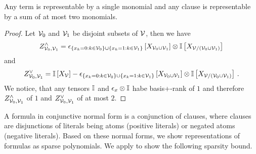\begin{lemma}
    \label{lem:clauseTermBasisPlus}
    Any term is representable by a single monomial and any clause is representable by a sum of at most two monomials. %
\end{lemma}
\begin{proof}
    Let $\mathcal{V}_0$ and $\mathcal{V}_1$ be disjoint subsets of $\mathcal{V}$, then we have
    \begin{align*}
        Z^{\land}_{\mathcal{V}_0,\mathcal{V}_1} = \epsilon_{
            \{x_{k} = 0 : k\in\mathcal{V}_0\} \cup \{x_{k} = 1 : k\in\mathcal{V}_1\}
        }\left[X_{\mathcal{V}_0\cup\mathcal{V}_1}\right] \otimes \mathbb{I}\left[X_{\mathcal{V}/(\mathcal{V}_0\cup\mathcal{V}_1)}\right]
    \end{align*}
    and
    \begin{align*}
        Z^{\lor}_{\mathcal{V}_0,\mathcal{V}_1} = \mathbb{I}\left[X_{\mathcal{V}}\right] - \epsilon_{
            \{x_{k} = 0 : k\in\mathcal{V}_0\} \cup \{x_{k} = 1 : k\in\mathcal{V}_1\}
        }\left[X_{\mathcal{V}_0\cup\mathcal{V}_1}\right]
        \otimes \mathbb{I}\left[X_{\mathcal{V}/(\mathcal{V}_0\cup\mathcal{V}_1)}\right] \, .
    \end{align*}
    We notice, that any tensors $\mathbb{I}$ and $\epsilon_{x}\otimes \mathbb{I}$ habe basis+-rank of $1$ and therefore $Z^{\land}_{\mathcal{V}_0,\mathcal{V}_1}$ of $1$ and $Z^{\lor}_{\mathcal{V}_0,\mathcal{V}_1}$ of at most $2$.
\end{proof}

A formula in conjunctive normal form is a conjunction of clauses, where clauses are disjunctions of literals being atoms (positive literals) or negated atoms (negative literals).
Based on these normal forms, we show representations of formulas as sparse polynomials. %
We apply  to show the following sparsity bound. %

